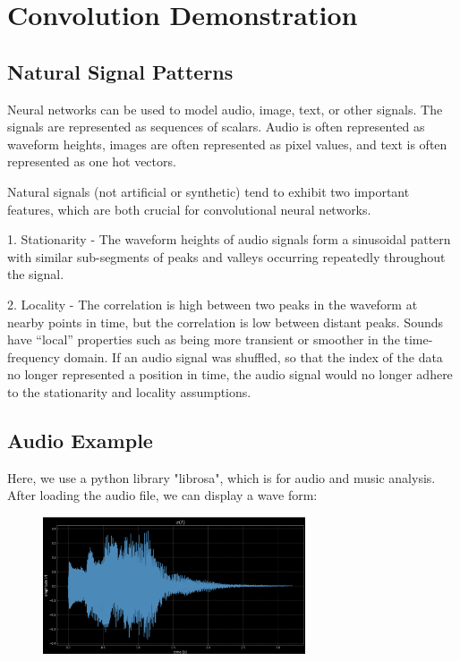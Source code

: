 \chapter{Convolution Demonstration}
\section{Natural Signal Patterns}
Neural networks can be used to model audio, image, text, or other signals. The signals are represented as sequences of scalars. Audio is often represented as waveform heights, images are often represented as pixel values, and text is often represented as one hot vectors.

Natural signals (not artificial or synthetic) tend to exhibit two important features, which are both crucial for convolutional neural networks.

1. Stationarity - The waveform heights of audio signals form a sinusoidal pattern with similar sub-segments of peaks and valleys occurring repeatedly throughout the signal.

2. Locality - The correlation is high between two peaks in the waveform at nearby points in time, but the correlation is low between distant peaks. Sounds have “local” properties such as being more transient or smoother in the time-frequency domain. If an audio signal was shuffled, so that the index of the data no longer represented a position in time, the audio signal would no longer adhere to the stationarity and locality assumptions.



\section{Audio Example}
Here, we use a python library "librosa", which is for audio and music analysis. After loading the audio file, we can display a wave form:

\begin{figure}[H]
    \centering
    \includegraphics[width=220pt]{figs/1.png}
    \label{fig:waveform}
\end{figure}

